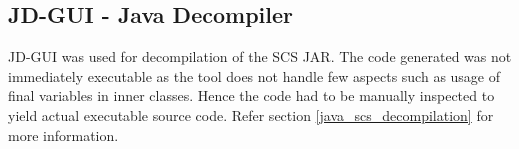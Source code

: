 \subsection{JD-GUI - Java Decompiler}
JD-GUI was used for decompilation of the SCS JAR. The code generated was not immediately executable as the tool does not handle few aspects such as usage of final variables in inner classes. Hence the code had to be manually inspected to yield actual executable source code. Refer section \ref{java_scs_decompilation} for more information.